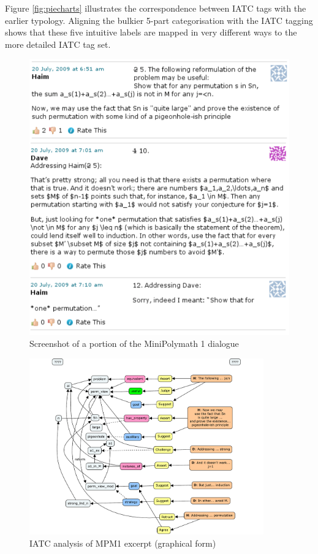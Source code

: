 \documentclass[smallextended,oneside]{svjour3}       %
\begin{document}
{Figure \ref{fig:piecharts} illustrates the correspondence between IATC
tags with the earlier typology.  Aligning the bulkier 5-part
categorisation with the IATC tagging shows that these five intuitive
labels are mapped in very different ways to the more detailed IATC tag
set.

\begin{figure}
\begin{center}
\includegraphics[width=.62\textwidth]{sample-minipolymath-comments}
\end{center}
\caption{Screenshot of a portion of the MiniPolymath 1 dialogue\label{fig:running-example-introduced}}
\end{figure}

\begin{figure}[h]\label{IATCtagging}
\begin{center}
\includegraphics[trim=2mm 0 1mm 18mm,clip=true,width=0.9\textwidth]{IATCmainexample}
\end{center}
\caption{IATC analysis of MPM1 excerpt (graphical form)\label{fig:running-example-analysed-graphic}}
\end{figure}

}
\end{document}
